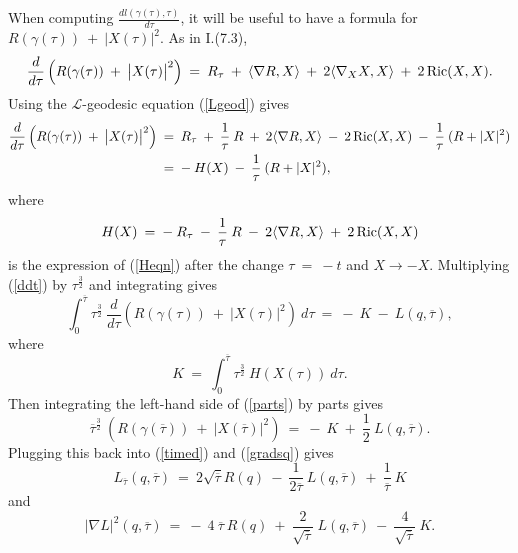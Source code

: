 When computing $\frac{dl(\gamma(\tau), \tau)}{d\tau}$, it will be useful
to have a formula for $R(\gamma(\tau)) \: + \: \big| X(\tau) \big|^2$.
As in I.(7.3),
\begin{equation}
\frac{d}{d\tau} \left( R(\gamma(\tau)) \: + \: \big| X(\tau) \big|^2 \right)
\: = \:
R_\tau \: + \: \langle \nabla R, X \rangle \: + \: 2 \langle \nabla_X X, X
\rangle \: + \: 2 \operatorname{Ric}(X, X).
\end{equation}
Using the ${\mathcal L}$-geodesic equation (\ref{Lgeod}) gives
\begin{align} \label{ddt}
\frac{d}{d\tau} \left( R(\gamma(\tau)) \: + \: \big| X(\tau) \big|^2 \right)
\: & = \:
R_\tau \: + \: \frac{1}{\tau} \: R \: + \:
2 \langle \nabla R, X \rangle \:
- \: 2 \operatorname{Ric}(X, X) \: - \: \frac{1}{\tau} \: (R + |X|^2) \\
& = \: - \: H(X) \: - \: \frac{1}{\tau} \: (R + |X|^2), \notag
\end{align}
where
\begin{equation} \label{Hexp}
H(X) \: = \: - \: R_\tau \: - \: \frac{1}{\tau} \: R \: - \:
2 \langle \nabla R, X \rangle \:
+ \: 2 \operatorname{Ric}(X, X)
\end{equation}
is the expression of (\ref{Heqn})
after the change $\tau \: = \:- t$ and $X \rightarrow -X$.
Multiplying (\ref{ddt}) by $\tau^{\frac32}$ and integrating gives
\begin{equation} \label{parts}
\int_0^{\overline{\tau}} \tau^{\frac32} \:
\frac{d}{d\tau} \left( R(\gamma(\tau)) \: + \: \big| X(\tau) \big|^2 \right)
\: d\tau
\: = \: - \: K \: - \: L(q, \overline{\tau}),
\end{equation}
where
\begin{equation}
K \: = \: \int_0^{\overline{\tau}} \tau^{\frac32} \: H(X(\tau)) \: d\tau.
\end{equation}
Then integrating the left-hand side of (\ref{parts}) by parts gives
\begin{equation} \label{sub4}
\overline{\tau}^{\frac32} \:
\left( R(\gamma(\overline{\tau})) \: + \: \big| X(\overline{\tau})
\big|^2 \right)
\: = \: - \: K \: + \: \frac12 \: L(q, \overline{\tau}).
\end{equation}
Plugging this back into  (\ref{timed}) and (\ref{gradsq}) gives
\begin{equation} \label{touse1}
L_{\overline{\tau}}(q, \overline{\tau}) \: = \:
2 \sqrt{\overline{\tau}} R(q) \:
- \: \frac{1}{2\overline{\tau}} \: L(q,\overline{\tau}) \: + \:
\frac{1}{\overline{\tau}} \: K
\end{equation}
and
\begin{equation} \label{ttouse1}
|\nabla L|^2(q, \overline{\tau}) \: = \:
- \: 4 \: {\overline{\tau}} \: R(q) \: + \:
\frac{2}{\sqrt{\overline{\tau}}} \: L(q, \overline{\tau}) \: - \:
\frac{4}{\sqrt{\overline{\tau}}} \: K.
\end{equation}

